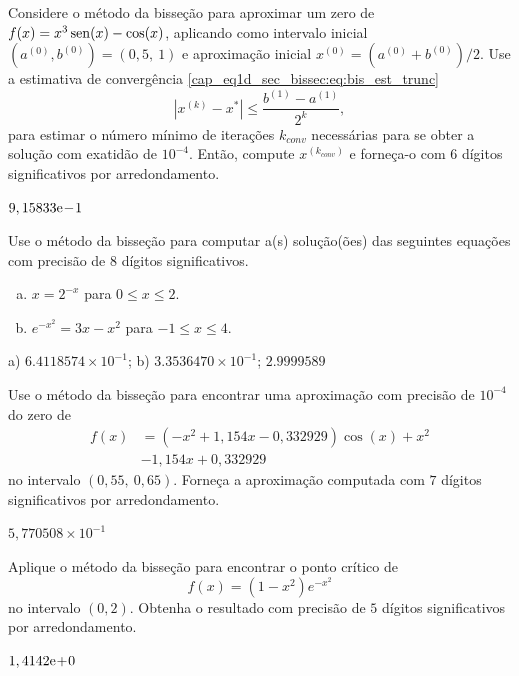 \begin{exer}
  Considere o método da bisseção para aproximar um zero de $f(x)=x^3\operatorname{sen}(x)-\cos(x)$, aplicando como intervalo inicial $(a^{(0)}, b^{(0)}) = (0,5, ~1)$ e aproximação inicial $x^{(0)}=(a^{(0)}+b^{(0)})/2$. Use a estimativa de convergência \eqref{cap_eq1d_sec_bissec:eq:bis_est_trunc}
  \begin{equation}
    \left|x^{(k)} - x^{*}\right| \leq \frac{b^{(1)}-a^{(1)}}{2^k},
  \end{equation}
para estimar o número mínimo de iterações $k_{conv}$ necessárias para se obter a solução com exatidão de $10^{-4}$. Então, compute $x^{(k_{conv})}$ e forneça-o com $6$ dígitos significativos por arredondamento.
\end{exer}
\begin{resp}
  $9,15833\mathrm{e}\!-\!1$
\end{resp}

\begin{exer}
  Use o método da bisseção para computar a(s) solução(ões) das seguintes equações com precisão de 8 dígitos significativos.
  \begin{enumerate}[a)]
  \item $x = 2^{-x}$ para $0\leq x \leq 2$.
  \item $e^{-x^2} = 3x - x^2$ para $-1\leq x\leq 4$.
  \end{enumerate}
\end{exer}
\begin{resp}
  a) $6.4118574\times 10^{-1}$; b) $3.3536470\times 10^{-1}$; $2.9999589$
\end{resp}

\begin{exer}
  Use o método da bisseção para encontrar uma aproximação com precisão de $10^{-4}$ do zero de
  \begin{align}
    f(x) &= (-x^2+1,154x-0,332929)\cos(x) + x^2 \nonumber\\
         &- 1,154x + 0,332929
  \end{align}
no intervalo $(0,55, ~0,65)$. Forneça a aproximação computada com $7$ dígitos significativos por arredondamento.
\end{exer}
\begin{resp}
  $5,770508\times 10^{-1}$
\end{resp}

\begin{exer}
  Aplique o método da bisseção para encontrar o ponto crítico de
  \begin{equation}
    f(x) = (1-x^2)e^{-x^2}
  \end{equation}
  no intervalo $(0, 2)$. Obtenha o resultado com precisão de $5$ dígitos significativos por arredondamento.
\end{exer}
\begin{resp}
  $1,4142\mathrm{e}\!+\!0$
\end{resp}

